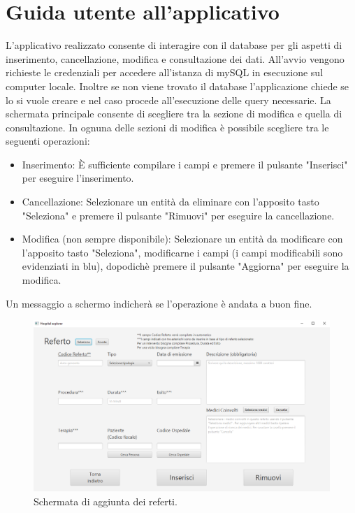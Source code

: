 \documentclass[a4paper,12pt]{report}
\begin{document}
\chapter{Guida utente all'applicativo}

L'applicativo realizzato consente di interagire con il database per gli aspetti di inserimento, cancellazione, modifica e consultazione dei dati.
All'avvio vengono richieste le credenziali per accedere all'istanza di mySQL in esecuzione sul computer locale. Inoltre se non viene trovato il database l'applicazione chiede se lo si 
vuole creare e nel caso procede all'esecuzione delle query necessarie.
La schermata principale consente di scegliere tra la sezione di modifica e quella di consultazione.
In ognuna delle sezioni di modifica è possibile scegliere tra le seguenti operazioni:
\begin{itemize}
    \item Inserimento: È sufficiente compilare i campi e premere il pulsante "Inserisci" per eseguire l'inserimento.
    \item Cancellazione: Selezionare un entità da eliminare con l'apposito tasto "Seleziona" e premere il pulsante "Rimuovi" per eseguire la cancellazione.
    \item Modifica (non sempre disponibile): Selezionare un entità da modificare con l'apposito tasto "Seleziona", modificarne i campi (i campi modificabili sono evidenziati in blu),
    dopodichè premere il pulsante "Aggiorna" per eseguire la modifica.
\end{itemize}
Un messaggio a schermo indicherà se l'operazione è andata a buon fine.

\begin{figure}[H]
	\centering{}
	\includegraphics[width=\textwidth]{img/Screenshot_aggiunta_referti.png}
	\caption{Schermata di aggiunta dei referti.}
	\label{img:add_referti}
\end{figure}
\end{document}
